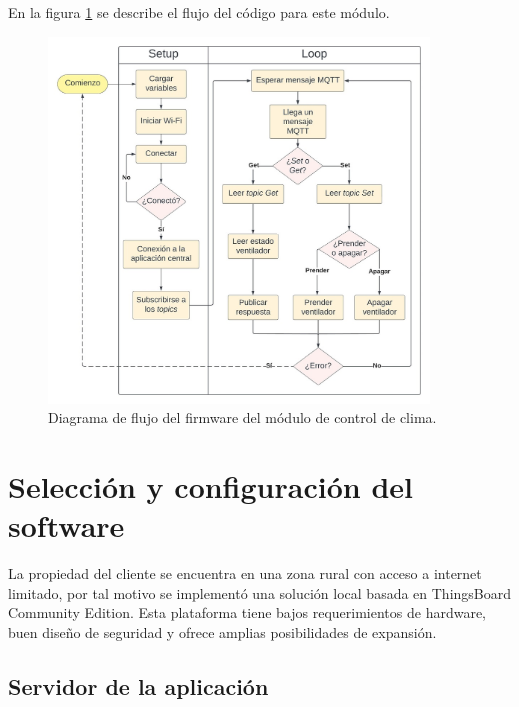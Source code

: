En la figura \ref{fig:flow_climacontrol} se describe el flujo del código para este módulo.

\begin{figure}[!h]
	\centering
	\includegraphics[width=0.9\textwidth]{./Figures/chapter3/FirmwareVentControl.jpg}
	\caption[Diagrama de flujo del firmware del módulo de control de clima]{Diagrama de flujo del firmware del módulo de control de clima.}
	\label{fig:flow_climacontrol}
\end{figure}








\section{Selección y configuración del software}
\label{sec:Selección y configuración del software}

La propiedad del cliente se encuentra en una zona rural con acceso a internet limitado, por tal motivo se implementó una solución local basada en  ThingsBoard Community Edition.
Esta plataforma tiene bajos requerimientos de hardware, buen diseño de seguridad y ofrece amplias posibilidades de expansión.

\subsection{Servidor de la aplicación}
\label{sec:Servidor de la aplicación}

